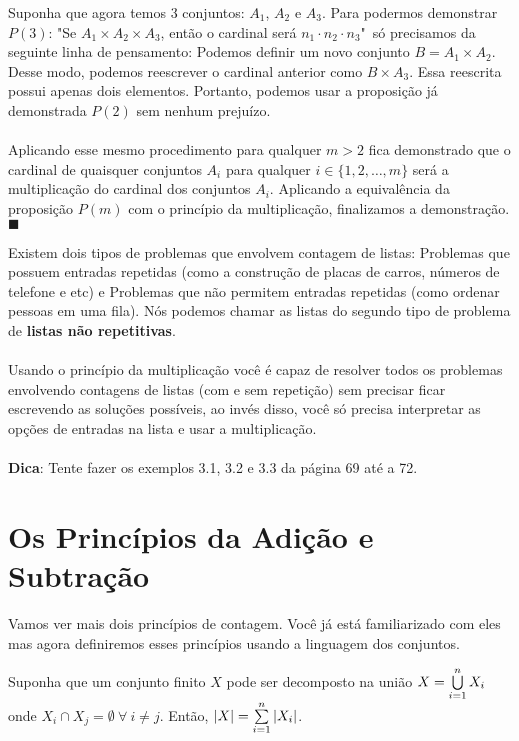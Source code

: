 \documentclass[main.tex]{subfiles}
\begin{document}
\begin{demonstration}
Suponha que agora temos 3 conjuntos: $A_1$, $A_2$ e $A_3$. Para podermos demonstrar $P(3)$: "Se $A_1 \times A_2 \times A_3$, então o cardinal será  $n_1 \cdot n_2 \cdot n_3$"\  só precisamos da seguinte linha de pensamento: Podemos definir um novo conjunto $B = A_1 \times A_2$. Desse modo, podemos reescrever o cardinal anterior como $B \times A_3$. Essa reescrita possui apenas dois elementos. Portanto, podemos usar a proposição já demonstrada $P(2)$ sem nenhum prejuízo.
\\~\\
Aplicando esse mesmo procedimento para qualquer $m > 2$ fica demonstrado que o cardinal de quaisquer conjuntos $A_i$ para qualquer $i \in \{1,2,\dots,m\}$ será a multiplicação do cardinal dos conjuntos $A_i$. Aplicando a equivalência da proposição $P(m)$ com o princípio da multiplicação, finalizamos a demonstração. $\blacksquare$
\end{demonstration}

Existem dois tipos de problemas que envolvem contagem de listas: Problemas que possuem entradas repetidas (como a construção de placas de carros, números de telefone e etc) e Problemas que não permitem entradas repetidas (como ordenar pessoas em uma fila). Nós podemos chamar as listas do segundo tipo de problema de \textbf{listas não repetitivas}.
\\~\\
Usando o princípio da multiplicação você é capaz de resolver todos os problemas envolvendo contagens de listas (com e sem repetição) sem precisar ficar escrevendo as soluções possíveis, ao invés disso, você só precisa interpretar as opções de entradas na lista e usar a multiplicação.
\\~\\
\textbf{Dica}: Tente fazer os exemplos 3.1, 3.2 e 3.3 da página 69 até a 72.

\section{Os Princípios da Adição e Subtração}

Vamos ver mais dois princípios de contagem. Você já está familiarizado com eles mas agora definiremos esses princípios usando a linguagem dos conjuntos.

\begin{fact}
Suponha que um conjunto finito $X$ pode ser decomposto na união $X = \bigcup_{i = 1}^{n}\limits X_i$ onde $ X_i \cap X_j = \emptyset \ \forall \ i \neq j$. Então, $|X| = \sum_{i = 1}^{n}\limits |X_i|$.
\end{fact}
\end{document}
